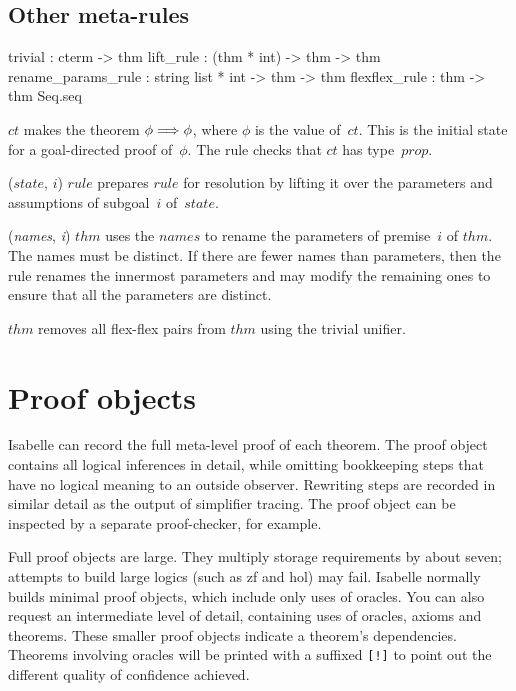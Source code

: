 \subsection{Other meta-rules}
\begin{ttbox} 
trivial            : cterm -> thm
lift_rule          : (thm * int) -> thm -> thm
rename_params_rule : string list * int -> thm -> thm
flexflex_rule      : thm -> thm Seq.seq
\end{ttbox}
\begin{ttdescription}
\item[\ttindexbold{trivial} $ct$] 
makes the theorem \(\phi\Longrightarrow\phi\), where $\phi$ is the value of~$ct$.
This is the initial state for a goal-directed proof of~$\phi$.  The rule
checks that $ct$ has type~$prop$.

\item[\ttindexbold{lift_rule} ($state$, $i$) $rule$] 
prepares $rule$ for resolution by lifting it over the parameters and
assumptions of subgoal~$i$ of~$state$.

\item[\ttindexbold{rename_params_rule} ({\it names}, {\it i}) $thm$] 
uses the $names$ to rename the parameters of premise~$i$ of $thm$.  The
names must be distinct.  If there are fewer names than parameters, then the
rule renames the innermost parameters and may modify the remaining ones to
ensure that all the parameters are distinct.

\item[\ttindexbold{flexflex_rule} $thm$]  
removes all flex-flex pairs from $thm$ using the trivial unifier.
\end{ttdescription}


\section{Proof objects}\label{sec:proofObjects}
 Isabelle can record the full meta-level proof of each
theorem.  The proof object contains all logical inferences in detail, while
omitting bookkeeping steps that have no logical meaning to an outside
observer.  Rewriting steps are recorded in similar detail as the output of
simplifier tracing.  The proof object can be inspected by a separate
proof-checker, for example.

Full proof objects are large.  They multiply storage requirements by about
seven; attempts to build large logics (such as {\sc zf} and {\sc hol}) may
fail.  Isabelle normally builds minimal proof objects, which include only uses
of oracles.  You can also request an intermediate level of detail, containing
uses of oracles, axioms and theorems.  These smaller proof objects indicate a
theorem's dependencies.  Theorems involving oracles will be printed with a
suffixed \verb|[!]| to point out the different quality of confidence achieved.

